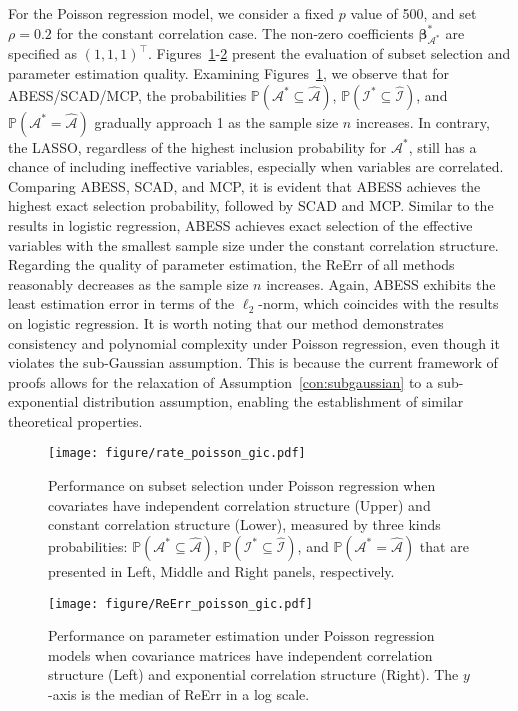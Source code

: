 For the Poisson regression model, we consider a fixed $p$ value of 500, and set $\rho = 0.2$ for the constant correlation case. The non-zero coefficients $\boldsymbol{\beta}^*_{\mathcal{A}^*}$ are specified as $(1, 1, 1)^\top$. Figures~\ref{fig:rate_poisson_gic}-\ref{fig:ReErr_poisson_gic} present the evaluation of subset selection and parameter estimation quality. Examining Figures~\ref{fig:rate_poisson_gic}, we observe that for ABESS/SCAD/MCP, the probabilities $\mathbb{P}(\mathcal{A}^* \subseteq \hat{\mathcal{A}})$, $\mathbb{P}(\mathcal{I}^* \subseteq \hat{\mathcal{I}})$, and $\mathbb{P}(\mathcal{A}^* = \hat{\mathcal{A}})$ gradually approach 1 as the sample size $n$ increases. In contrary, the LASSO, regardless of the highest inclusion probability for $\mathcal{A}^*$, still has a chance of including ineffective variables, especially when variables are correlated. Comparing ABESS, SCAD, and MCP, it is evident that ABESS achieves the highest exact selection probability, followed by SCAD and MCP. Similar to the results in logistic regression, ABESS achieves exact selection of the effective variables with the smallest sample size under the constant correlation structure.
Regarding the quality of parameter estimation, the ReErr of all methods reasonably decreases as the sample size $n$ increases. Again, ABESS exhibits the least estimation error in terms of the $\ell_2$-norm, which coincides with the results on logistic regression. It is worth noting that our method demonstrates consistency and polynomial complexity under Poisson regression, even though it violates the sub-Gaussian assumption. This is because the current framework of proofs allows for the relaxation of Assumption~\ref{con:subgaussian} to a sub-exponential distribution assumption, enabling the establishment of similar theoretical properties.

\begin{figure}[htbp]
\centering
\texttt{[image: figure/rate\_poisson\_gic.pdf]}
\informsMOR{
\vspace{-30pt}
}\fi
\caption{Performance on subset selection under Poisson regression when covariates have independent correlation structure (Upper) and constant correlation structure (Lower), measured by three kinds probabilities: $\mathbb{P}(\mathcal{A}^* \subseteq \hat{\mathcal{A}})$, $\mathbb{P}(\mathcal{I}^* \subseteq \hat{\mathcal{I}})$, and $\mathbb{P}(\mathcal{A}^* = \hat{\mathcal{A}})$ that are presented in Left, Middle and Right panels, respectively.}
\label{fig:rate_poisson_gic}
\end{figure}
\begin{figure}[htbp]
\centering
\texttt{[image: figure/ReErr\_poisson\_gic.pdf]}
\informsMOR{
\vspace{-5pt}
}\fi
\caption{Performance on parameter estimation under Poisson regression models when covariance matrices have independent correlation structure (Left) and exponential correlation structure (Right). The $y$-axis is the median of ReErr in a log scale.}
\label{fig:ReErr_poisson_gic}
\end{figure}


